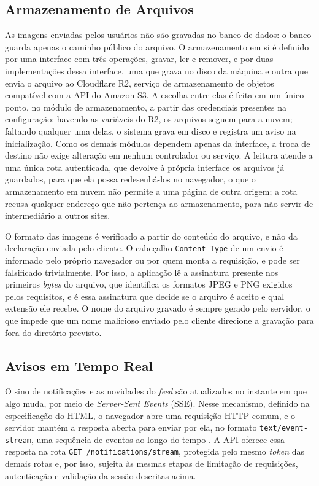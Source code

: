 \subsection{Armazenamento de Arquivos}

As imagens enviadas pelos usuários não são gravadas no banco de dados: o banco guarda apenas o caminho público do arquivo. O armazenamento em si é definido por uma interface com três operações, gravar, ler e remover, e por duas implementações dessa interface, uma que grava no disco da máquina e outra que envia o arquivo ao Cloudflare R2, serviço de armazenamento de objetos compatível com a API do Amazon S3. A escolha entre elas é feita em um único ponto, no módulo de armazenamento, a partir das credenciais presentes na configuração: havendo as variáveis do R2, os arquivos seguem para a nuvem; faltando qualquer uma delas, o sistema grava em disco e registra um aviso na inicialização. Como os demais módulos dependem apenas da interface, a troca de destino não exige alteração em nenhum controlador ou serviço. A leitura atende a uma única rota autenticada, que devolve à própria interface os arquivos já guardados, para que ela possa redesenhá-los no navegador, o que o armazenamento em nuvem não permite a uma página de outra origem; a rota recusa qualquer endereço que não pertença ao armazenamento, para não servir de intermediário a outros sites.

O formato das imagens é verificado a partir do conteúdo do arquivo, e não da declaração enviada pelo cliente. O cabeçalho \texttt{Content-Type} de um envio é informado pelo próprio navegador ou por quem monta a requisição, e pode ser falsificado trivialmente. Por isso, a aplicação lê a assinatura presente nos primeiros \textit{bytes} do arquivo, que identifica os formatos JPEG e PNG exigidos pelos requisitos, e é essa assinatura que decide se o arquivo é aceito e qual extensão ele recebe. O nome do arquivo gravado é sempre gerado pelo servidor, o que impede que um nome malicioso enviado pelo cliente direcione a gravação para fora do diretório previsto.

\subsection{Avisos em Tempo Real}
\label{subsec:avisosTempoReal}

O sino de notificações e as novidades do \textit{feed} são atualizados no instante em que algo muda, por meio de \textit{Server-Sent Events} (SSE). Nesse
mecanismo, definido na especificação do HTML, o navegador abre uma requisição HTTP comum, e o servidor mantém a resposta aberta para enviar por ela, no
formato \texttt{text/event-stream}, uma sequência de eventos ao longo do tempo \cite{whatwg2026sse}. A API oferece essa resposta na rota
\texttt{GET /notifications/stream}, protegida pelo mesmo \textit{token} das demais rotas e, por isso, sujeita às mesmas etapas de limitação de requisições,
autenticação e validação da sessão descritas acima.

